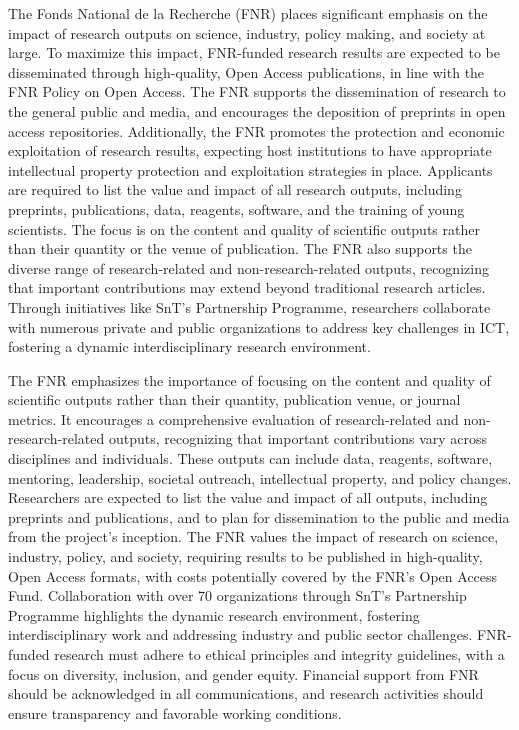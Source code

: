 \documentclass{article}
\begin{document}
The Fonds National de la Recherche (FNR) places significant emphasis on the impact of research outputs on science, industry, policy making, and society at large. To maximize this impact, FNR-funded research results are expected to be disseminated through high-quality, Open Access publications, in line with the FNR Policy on Open Access. The FNR supports the dissemination of research to the general public and media, and encourages the deposition of preprints in open access repositories. Additionally, the FNR promotes the protection and economic exploitation of research results, expecting host institutions to have appropriate intellectual property protection and exploitation strategies in place. Applicants are required to list the value and impact of all research outputs, including preprints, publications, data, reagents, software, and the training of young scientists. The focus is on the content and quality of scientific outputs rather than their quantity or the venue of publication. The FNR also supports the diverse range of research-related and non-research-related outputs, recognizing that important contributions may extend beyond traditional research articles. Through initiatives like SnT’s Partnership Programme, researchers collaborate with numerous private and public organizations to address key challenges in ICT, fostering a dynamic interdisciplinary research environment.

The FNR emphasizes the importance of focusing on the content and quality of scientific outputs rather than their quantity, publication venue, or journal metrics. It encourages a comprehensive evaluation of research-related and non-research-related outputs, recognizing that important contributions vary across disciplines and individuals. These outputs can include data, reagents, software, mentoring, leadership, societal outreach, intellectual property, and policy changes. Researchers are expected to list the value and impact of all outputs, including preprints and publications, and to plan for dissemination to the public and media from the project's inception. The FNR values the impact of research on science, industry, policy, and society, requiring results to be published in high-quality, Open Access formats, with costs potentially covered by the FNR’s Open Access Fund. Collaboration with over 70 organizations through SnT’s Partnership Programme highlights the dynamic research environment, fostering interdisciplinary work and addressing industry and public sector challenges. FNR-funded research must adhere to ethical principles and integrity guidelines, with a focus on diversity, inclusion, and gender equity. Financial support from FNR should be acknowledged in all communications, and research activities should ensure transparency and favorable working conditions.
\end{document}
